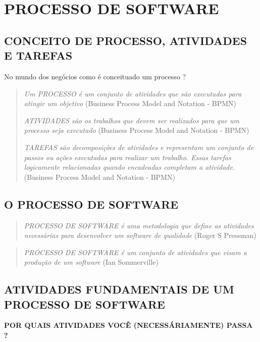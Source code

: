 \documentclass[
]{book}
\begin{document}
\chapter{PROCESSO DE SOFTWARE}\label{processo-de-software}

\section{CONCEITO DE PROCESSO, ATIVIDADES E TAREFAS}\label{conceito-de-processo-atividades-e-tarefas}

No mundo dos negócios como é conceituado um processo ?

\begin{quote}
\emph{Um PROCESSO é um conjunto de atividades que são executadas para atingir um objetivo} (Business Process Model and Notation - BPMN)

\emph{ATIVIDADES são os trabalhos que devem ser realizados para que um processo seja executado} (Business Process Model and Notation - BPMN)

\emph{TAREFAS são decomposições de atividades e representam um conjunto de passos ou ações executadas para realizar um trabalho. Essas tarefas logicamente relacionadas quando encadeadas completam a atividade.} (Business Process Model and Notation - BPMN)
\end{quote}

\section{O PROCESSO DE SOFTWARE}\label{o-processo-de-software}

\begin{quote}
\emph{PROCESSO DE SOFTWARE é uma metodologia que define as atividades necessárias para desenvolver um software de qualidade} (Roger S Pressman)
\end{quote}

\begin{quote}
\emph{PROCESSO DE SOFTWARE é um conjunto de atividades que visam a produção de um software} (Ian Sommerville)
\end{quote}

\section{ATIVIDADES FUNDAMENTAIS DE UM PROCESSO DE SOFTWARE}\label{atividades-fundamentais-de-um-processo-de-software}

\textbf{POR QUAIS ATIVIDADES VOCÊ (NECESSÁRIAMENTE) PASSA ?}
\end{document}
